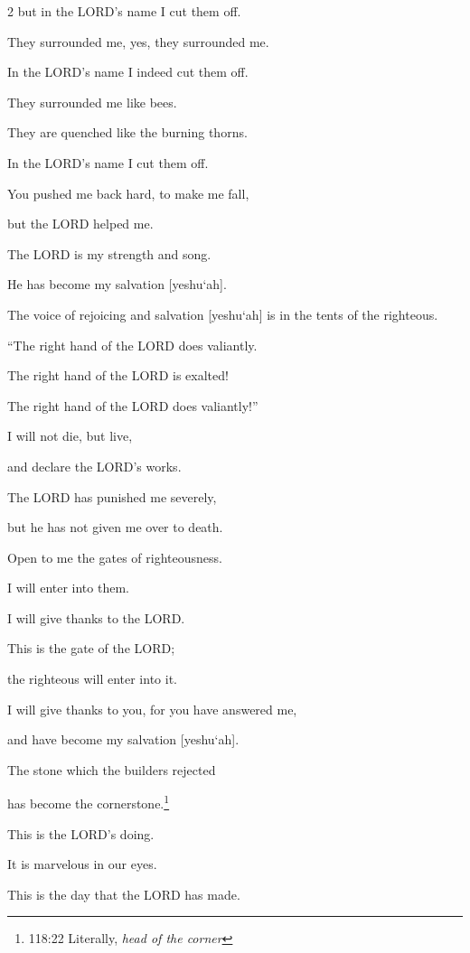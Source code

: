 \begin{multicols}{2}
	but in the LORD’s name I cut them off.
	
	
	\myverse{}They surrounded me, yes, they surrounded me.
	
	In the LORD’s name I indeed cut them off.
	
	
	\myverse{}They surrounded me like bees.
	
	They are quenched like the burning thorns.
	
	In the LORD’s name I cut them off.
	
	
	\myverse{}You pushed me back hard, to make me fall,
	
	but the LORD helped me.
	
	
	\myverse{}The LORD is my strength and song.
	
	He has become my salvation [yeshu`ah].
	
	
	\myverse{}The voice of rejoicing and salvation [yeshu`ah] is in the
	tents of the righteous.
	
	“The right hand of the LORD does valiantly.
	
	
	\myverse{}The right hand of the LORD is exalted!
	
	The right hand of the LORD does valiantly!”
	
	
	\myverse{}I will not die, but live,
	
	and declare the LORD’s works.
	
	
	\myverse{}The LORD has punished me severely,
	
	but he has not given me over to death.
	
	
	\myverse{}Open to me the gates of righteousness.
	
	I will enter into them.
	
	I will give thanks to the LORD.
	
	
	\myverse{}This is the gate of the LORD;
	
	the righteous will enter into it.
	
	
	\myverse{}I will give thanks to you, for you have answered me,
	
	and have become my salvation [yeshu`ah].
	
	
	\myverse{}The stone which the builders rejected
	
	has become the cornerstone.\footnote{118:22 Literally, \textit{head of the corner}}
	
	
	\myverse{}This is the LORD’s doing.
	
	It is marvelous in our eyes.
	
	
	\myverse{}This is the day that the LORD has made.
	

\end{multicols}
